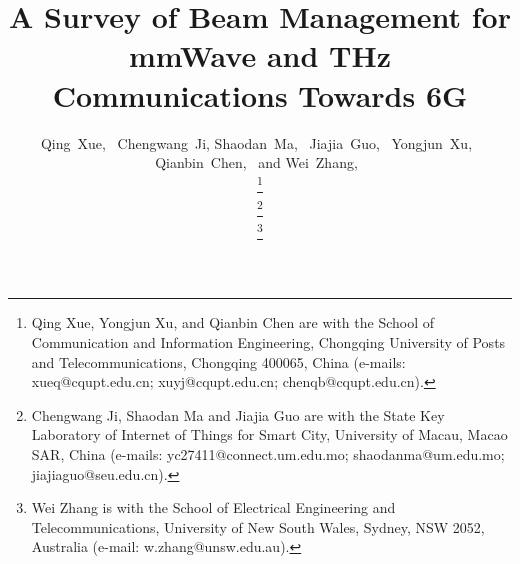 \documentclass[journal,comsoc]{IEEEtran}
\begin{document}
%
\title{A Survey of Beam Management for mmWave and THz Communications Towards 6G}

\author{Qing~Xue,~
	Chengwang~Ji,
	Shaodan~Ma,~
	Jiajia~Guo,~
	Yongjun~Xu,~
	Qianbin~Chen,~
	and Wei~Zhang,~
	
	
	\thanks{Qing Xue, Yongjun Xu, and Qianbin Chen are with the School of Communication and Information Engineering, Chongqing University of Posts and Telecommunications, Chongqing 400065, China (e-mails: xueq@cqupt.edu.cn; xuyj@cqupt.edu.cn; chenqb@cqupt.edu.cn).}
	
	\thanks{Chengwang Ji, Shaodan Ma and Jiajia Guo are with the State Key Laboratory of Internet of Things for Smart City, University of Macau, Macao SAR, China (e-mails: yc27411@connect.um.edu.mo; shaodanma@um.edu.mo; jiajiaguo@seu.edu.cn).}
	
	\thanks{Wei Zhang is with the School of Electrical Engineering and Telecommunications, University of New South Wales, Sydney, NSW 2052, Australia (e-mail: w.zhang@unsw.edu.au).}
	
}



\maketitle
\end{document}
